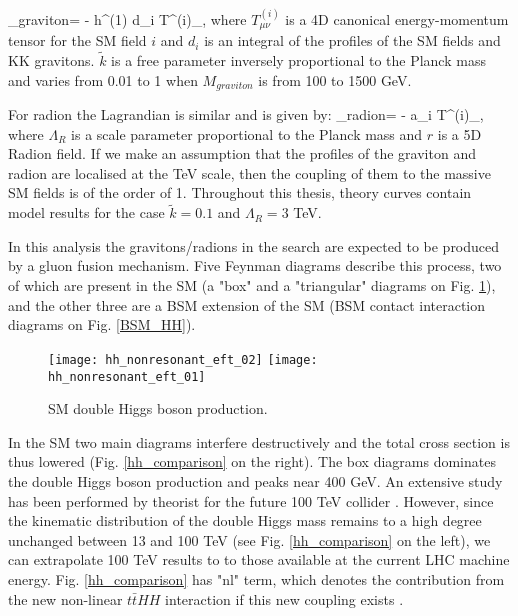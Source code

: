\beqn\label{lagr_graviton}
\Lagr_{graviton}=  -  h^{\mu\nu(1)} \times d_i T^{(i)}_{\mu\nu},  
\eeqn
where $T^{(i)}_{\mu\nu}$ is a 4D canonical energy-momentum tensor \cite{Forger:2003ut} for the SM field $i$ and $d_i$ is an integral of the profiles of the SM fields and KK gravitons. $\tilde{k}$ is a free parameter inversely proportional to the Planck mass and varies from 0.01 to 1 when $M_{graviton}$ is from 100 to 1500 GeV. 

For radion the Lagrandian is similar and is given by:
\beqn\label{lagr_radion}
\Lagr_{radion}=  -  \times a_i T^{\mu (i)}_{\mu},  
\eeqn
where $\Lambda_R$ is a scale parameter proportional to the Planck mass and $r$ is a 5D Radion field. If we make an assumption that the profiles of the graviton and radion are localised at the TeV scale, then the coupling of them to the massive SM fields is of the order of 1. Throughout this thesis, theory curves contain model results for the case $\tilde{k}=0.1$ and $\Lambda_R = 3 $ TeV.  

In this analysis the gravitons/radions in the search are expected to be produced by a gluon fusion mechanism. Five Feynman diagrams describe this process, two of which are present in the SM (a "box" and a "triangular" diagrams on Fig. \ref{SM_HH}), and the other three are a BSM extension of the SM (BSM contact interaction diagrams on Fig. \ref{BSM_HH}).   



\begin{figure}[H]
  \centering
    \texttt{[image: hh\_nonresonant\_eft\_02]}
     \texttt{[image: hh\_nonresonant\_eft\_01]}
    \caption{SM double Higgs boson production.}
    \label{SM_HH}
\end{figure}

In the SM two main diagrams interfere destructively and the total cross section is thus lowered (Fig. \ref{hh_comparison} on the right). The box diagrams dominates the double Higgs boson production and peaks near 400 GeV. An extensive study has been performed by theorist for the future 100 TeV collider \cite{Chen:2014xra,}. However, since the kinematic distribution of the double Higgs mass remains to a high degree unchanged  between 13 and 100 TeV (see Fig. \ref{hh_comparison} on the left), we can extrapolate 100 TeV results to to those available at the current LHC machine energy. Fig. \ref{hh_comparison} has "nl" term, which denotes the contribution from the new non-linear $t\bar{t}HH$ interaction if this new coupling exists \cite{Contino:2012xk}. 


